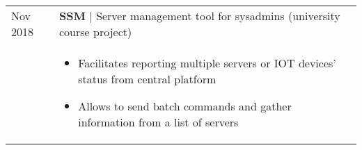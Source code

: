\documentclass[a4paper,10pt]{article}
\begin{document}
\begin{tabular}{p{1.5cm}p{14.8cm}}

 Nov 2018 & \textbf{SSM} | Server management tool for sysadmins (university course project)\\
 & \footnotesize{ \begin{itemize}[noitemsep,topsep=3pt]
 \vspace{-0.1in}
 \item Facilitates reporting multiple servers or IOT devices' status from central platform 
 \item Allows to send batch commands and gather information from a list of servers
 \end{itemize}} \\


\end{tabular}
\end{document}
